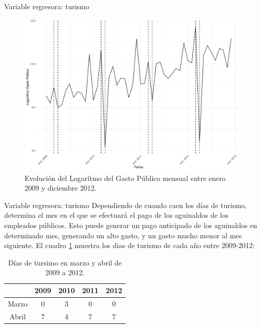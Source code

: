 \documentclass[
  ignorenonframetext,
]{beamer}
\begin{document}
\begin{frame}{Variable regresora: turismo}
\protect\hypertarget{variable-regresora-turismo}{}
\begin{figure}[H]

{\centering \includegraphics[width=0.85\linewidth]{presentacion_files/figure-beamer/gasto_2009-2012-1} 

}

\caption{\label{gasto_2009-2013} Evolución del Logarítmo del Gasto Público mensual entre enero 2009 y diciembre 2012.}\label{fig:gasto_2009-2012}
\end{figure}
\end{frame}

\begin{frame}{Variable regresora: turismo}
\protect\hypertarget{variable-regresora-turismo-1}{}
Dependiendo de cuando caen los días de turismo, determina el mes en el
que se efectuará el pago de los aguinaldos de los empleados públicos.
Esto puede generar un pago anticipado de los aguinaldos en determinado
mes, generando un alto gasto, y un gasto mucho menor al mes siguiente.
El cuadro \ref{tab:turismo} muestra los dias de turismo de cada año
entre 2009-2012:

\begin{table}[H]
\centering
\begin{tabular}{c c c c c}
\hline
 & 2009 & 2010 & 2011 & 2012 \\ \hline
Marzo & 0 & 3 & 0 & 0 \\ 
Abril & 7 & 4 & 7 & 7 \\ \hline
\end{tabular}
\caption{Días de tursimo en marzo y abril de 2009 a 2012.}
\label{tab:turismo}
\end{table}
\end{frame}
\end{document}
